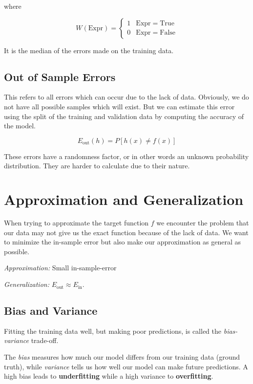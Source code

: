 where

\[
	W(\mathrm{Expr}) = \begin{cases}
		1 & \mathrm{Expr} = \mathrm{True}  \\
		0 & \mathrm{Expr} = \mathrm{False}
	\end{cases}
\]

It is the median of the errors made on the training data.

\subsection{Out of Sample Errors}

This refers to all errors which can occur due to the lack of data. Obviously, we do not
have all possible samples which will exist. But we can estimate this error using the split of the training and validation data by 
computing the accuracy of the model.

\[
	E_{\text{out}} (h) = P[h(x) \neq f(x)]
\]

These errors have a randomness factor, or in other words an unknown probability distribution.
They are harder to calculate due to their nature.

\section{Approximation and Generalization}

When trying to approximate the target function \(f\) we encounter the problem that our data may not
give us the exact function because of the lack of data. We want to minimize the in-sample error
but also make our approximation as general as possible.

\emph{Approximation:} Small in-sample-error

\emph{Generalization:} \(E_{\text{out}} \approx E_{\text{in}}\).

\subsection{Bias and Variance}

Fitting the training data well, but making poor predictions, is called the \emph{bias-variance} trade-off.

The \emph{bias} measures how much our model differs from our training data (ground truth), while \emph{variance} tells us how well 
our model can make future predictions. A high bias leads to \textbf{underfitting} while a high variance to \textbf{overfitting}.


